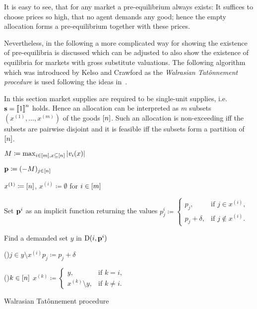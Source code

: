 It is easy to see, that for any market a pre-equilibrium always exists: It suffices to choose prices so high, that no agent demands any good; hence the empty allocation forms a pre-equilibrium together with these prices.

Nevertheless, in the following a more complicated way for showing the existence of pre-equilibria is discussed which can be adjusted to also show the existence of equilibria for markets with gross substitute valuations.
The following algorithm which was introduced by Kelso and Crawford as the \emph{Walrasian Tat\^{o}nnement procedure} is used following the ideas in~\cite[Section~1]{PaesLeme2017}.

In this section market supplies are required to be single-unit supplies, i.e. $\mathbf{s} = \left\llbracket 1 \right\rrbracket^n$ holds.
Hence an allocation can be interpreted as $m$ subsets $(x^{(1)}, \dots, x^{(m)})$ of the goods $\left[ n \right]$.
Such an allocation is non-exceeding iff the subsets are pairwise disjoint and it is feasible iff the subsets form a partition of $\left[ n \right]$.


\begin{algorithm}
	\DontPrintSemicolon
	
	$M \coloneqq \max_{i\in\left[ m \right], x\subseteq \left[ n \right]} \left\lvert v_i(x) \right\rvert$
	
	$\mathbf{p} \coloneqq (-M)_{j\in\left[ n \right]}$
	
	$x^{(1)} \coloneqq \left[ n \right]$, $x^{(i)} \coloneqq \emptyset$ for $i\in\left[ m \right]$
	
	Set $\mathbf{p}^i$ as an implicit function returning the values $p_j^i \coloneqq\begin{cases}
		p_j, & \text{if $j\in x^{(i)}$}, \\
		p_j + \delta, & \text{if $j\notin x^{(i)}$.}
	\end{cases}$
	
	{
		Find a demanded set $y$ in $\operatorname{D}(i, \mathbf{p}^i)$\label{line-find-dem-set}
		
		\lForEach(){$j\in y \setminus x^{(i)}$}{$p_j \coloneqq p_j + \delta$} 
				
		\lForEach(){$k\in\left[ n \right]$}{
			$x^{(k)} \coloneqq \begin{cases}
				y, & \text{if $k = i$,} \\
				x^{(k)} \setminus y, & \text{if $k \neq i$.}
			\end{cases}$}
	}
	\Return{$(\fp, \fx)$}
	\caption{Walrasian Tat\^{o}nnement procedure}
\end{algorithm}

